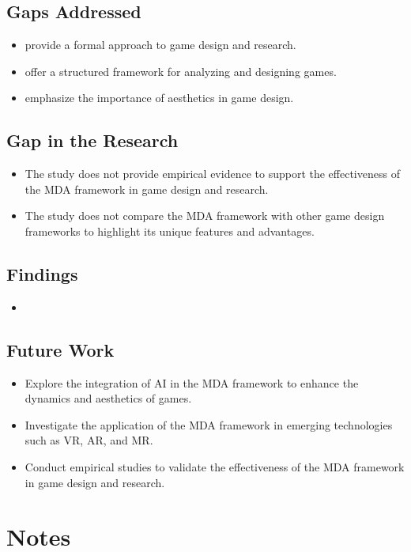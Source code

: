 \subsection{Gaps Addressed}
\begin{itemize}
    \item provide a formal approach to game design and research.
    \item offer a structured framework for analyzing and designing games.
    \item emphasize the importance of aesthetics in game design.
\end{itemize}

\subsection{Gap in the Research}
\begin{itemize}
    \item The study does not provide empirical evidence to support the effectiveness of the MDA framework in game design and research.
    \item The study does not compare the MDA framework with other game design frameworks to highlight its unique features and advantages.
\end{itemize}

\subsection{Findings}
\begin{itemize}
    \item 
\end{itemize}


\subsection{Future Work}
\begin{itemize}
    \item Explore the integration of AI in the MDA framework to enhance the dynamics and aesthetics of games.
    \item Investigate the application of the MDA framework in emerging technologies such as VR, AR, and MR.
    \item Conduct empirical studies to validate the effectiveness of the MDA framework in game design and research.
\end{itemize}

\section{Notes}

